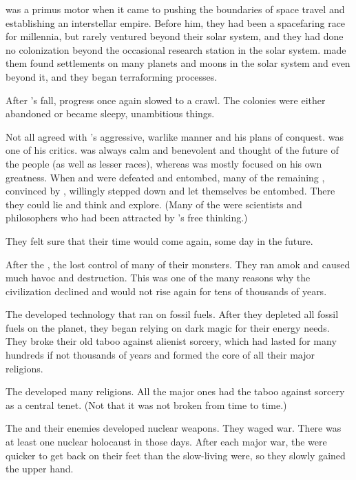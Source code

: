 \Sethicus was a primus motor when it came to pushing the boundaries of space travel and establishing an interstellar \ophidian empire. 
Before him, they had been a spacefaring race for millennia, but rarely ventured beyond their solar system, and they had done no colonization beyond the occasional research station in the solar system. 
\Sethicus made them found settlements on many planets and moons in the solar system and even beyond it, and they began terraforming processes. 

After \Sethicus's fall, \ophidian progress once again slowed to a crawl. 
The colonies were either abandoned or became sleepy, unambitious things. 

Not all \dragons agreed with \Sethicus's aggressive, warlike manner and his plans of conquest. 
\Nexagglachel was one of his critics.
\Nexagglachel was always calm and benevolent and thought of the future of the people (\ophidians as well as lesser races), whereas \Sethicus was mostly focused on his own greatness. 
When \Sethicus and \Tiamat were defeated and entombed, many of the remaining \dragons, convinced by \Nexagglachel, willingly stepped down and let themselves be entombed.
There they could lie and think and explore. 
(Many of the \dragons were scientists and philosophers who had been attracted by \Sethicus's free thinking.)

They felt sure that their time would come again, some day in the future. 


After the \firstbanewar, the \ophidians lost control of many of their monsters. 
They ran amok and caused much havoc and destruction.
This was one of the many reasons why the \ophidian civilization declined and would not rise again for tens of thousands of years. 


The \aryothim developed technology that ran on fossil fuels. 
After they depleted all fossil fuels on the planet, they began relying on dark magic for their energy needs. 
They broke their old taboo against alienist sorcery, which had lasted for many hundreds if not thousands of years and formed the core of all their major religions. 

The \aryothim developed many religions. 
All the major ones had the taboo against sorcery as a central tenet. 
(Not that it was not broken from time to time.)


The \aryothim and their \quiljaaran enemies developed nuclear weapons. 
They waged war. 
There was at least one nuclear holocaust in those days. 
After each major war, the \aryothim were quicker to get back on their feet than the slow-living \quiljaaran were, so they slowly gained the upper hand. 

